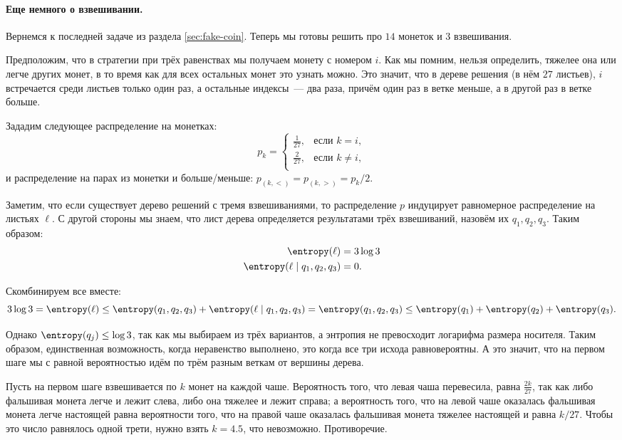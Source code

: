 \paragraph{Еще немного о взвешивании.} Вернемся к последней задаче из раздела \ref{sec:fake-coin}. Теперь
мы готовы решить про $14$ монеток и $3$ взвешивания.

Предположим, что в стратегии при трёх равенствах мы получаем монету с номером $i$. Как мы помним, нельзя
определить, тяжелее она или легче других монет, в то время как для всех остальных монет это узнать
можно. Это значит, что в дереве решения (в нём $27$ листьев), $i$ встречается среди листьев только один
раз, а остальные индексы~--- два раза, причём один раз в ветке меньше, а в другой раз в ветке больше.

Зададим следующее распределение на монетках:
$$
    p_k =
    \begin{cases}
        \frac{1}{27}, &\text{если } k = i,\\
        \frac{2}{27}, &\text{если } k \ne i,\\
    \end{cases}
$$    
и распределение на парах из монетки и больше/меньше: $ p_{(k, <)} = p_{(k, >)} = p_k / 2$.

Заметим, что если существует дерево решений с тремя взвешиваниями, то распределение $p$ индуцирует
равномерное распределение на листьях $\ell$. С другой стороны мы знаем, что лист дерева определяется  
результатами трёх взвешиваний, назовём их $q_1, q_2, q_3$. Таким образом:
\begin{align*}
  \entropy(\ell) &= 3 \log 3\\
  \entropy(\ell \mid q_1, q_2, q_3) &= 0.
\end{align*}

Скомбинируем все вместе:
$$
    3\log 3 = \entropy(\ell) \le \entropy(q_1, q_2, q_3) + \entropy(\ell \mid q_1, q_2, q_3) =
    \entropy(q_1, q_2, q_3) \le \entropy(q_1) + \entropy(q_2) + \entropy(q_3).
$$
    
Однако $\entropy(q_j) \le \log 3$, так как мы выбираем из трёх вариантов, а энтропия не превосходит
логарифма размера носителя. Таким образом, единственная возможность, когда неравенство выполнено, это
когда все три исхода равновероятны. А это значит, что на первом шаге мы с равной вероятностью идём по
трём разным веткам от вершины дерева.

Пусть на первом шаге взвешивается по $k$ монет на каждой чаше. Вероятность того, что левая чаша
перевесила, равна $\frac{2k}{27}$, так как либо фальшивая монета легче и лежит слева, либо она тяжелее и
лежит справа; а вероятность того, что на левой чаше оказалась фальшивая монета легче настоящей равна
вероятности того, что на правой чаше оказалась фальшивая монета тяжелее настоящей и равна $k / 27$. Чтобы
это число равнялось одной трети, нужно взять $k = 4.5$, что невозможно. Противоречие.


